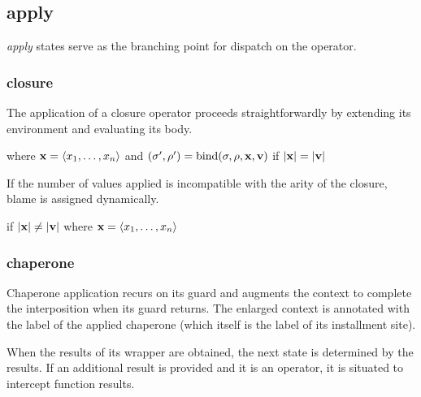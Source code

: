 \documentclass{sigplanconf}
\begin{document}




\subsection{apply}

\emph{apply} states serve as the branching point for dispatch on the operator.

\subsubsection{closure}

The application of a closure operator proceeds straightforwardly by extending its environment and evaluating its body.

where $\mathbf{x}=\langle x_1,\dots,x_n\rangle$ and $(\sigma',\rho')=\mathrm{bind}(\sigma,\rho,\mathbf{x},\mathbf{v})$ if $|\mathbf{x}|=|\mathbf{v}|$

If the number of values applied is incompatible with the arity of the closure, blame is assigned dynamically.

if $|\mathbf{x}|\ne|\mathbf{v}|$ where $\mathbf{x}=\langle x_1,\dots,x_n\rangle$

\subsubsection{chaperone}

Chaperone application recurs on its guard and augments the context to complete the interposition when its guard returns.
The enlarged context is annotated with the label of the applied chaperone (which itself is the label of its installment site).


When the results of its wrapper are obtained, the next state is determined by the results.
If an additional result is provided and it is an operator, it is situated to intercept function results.
\end{document}

